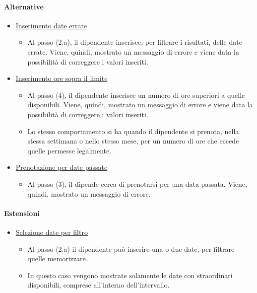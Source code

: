 \paragraph{Alternative}
\begin{itemize}
	\item \underline{Inserimento date errate}
		\begin{itemize}
			\item Al passo (2.a), il dipendente inserisce, per filtrare i risultati, delle date errate. Viene, quindi, mostrato un messaggio di errore e viene data la possibilità di correggere i valori inseriti.
		\end{itemize}
	\item \underline{Inserimento ore sopra il limite}
		\begin{itemize}
			\item Al passo (4), il dipendente inserisce un numero di ore superiori a quelle disponibili. Viene, quindi, mostrato un messaggio di errore e viene data la possibilità di correggere i valori inseriti.
			\item Lo stesso comportamento si ha quando il dipendente si prenota, nella stessa settimana o nello stesso mese, per un numero di ore che eccede quelle permesse legalmente.
		\end{itemize}
	\item \underline{Prenotazione per date passate}
		\begin{itemize}
			\item Al passo (3), il dipende cerca di prenotarsi per una data passata. Viene, quindi, mostrato un messaggio di errore.
		\end{itemize}
\end{itemize}
\paragraph{Estensioni}
\begin{itemize}
	\item \underline{Selezione date per filtro}
		\begin{itemize}
			\item Al passo (2.a) il dipendente può inserire una o due date, per filtrare quelle memorizzare.
			\item In questo caso vengono mostrate solamente le date con straordinari disponibili, comprese all'interno dell'intervallo.
		\end{itemize}
\end{itemize}